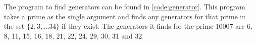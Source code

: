 The program to find generators can be found in \autoref{code:generator}. This program takes a prime as the single argument and finds any generators for that prime in the set $\{2, 3, \ldots 34\}$ if they exist. The generators it finds for the prime 10007 are 6, 8, 11, 15, 16, 18, 21, 22, 24, 29, 30, 31 and 32.

